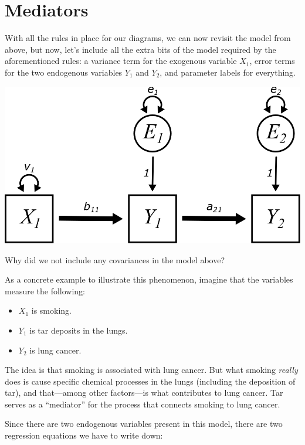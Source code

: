 \documentclass[
]{book}
\providecommand{\tightlist}{%
  \setlength{\itemsep}{0pt}\setlength{\parskip}{0pt}}
\begin{document}
\hypertarget{mediation-mediators}{%
\section{Mediators}\label{mediation-mediators}}

With all the rules in place for our diagrams, we can now revisit the model from above, but now, let's include all the extra bits of the model required by the aforementioned rules: a variance term for the exogenous variable \(X_{1}\), error terms for the two endogenous variables \(Y_{1}\) and \(Y_{2}\), and parameter labels for everything.

\begin{center}\includegraphics{graphics/mediator_vars} \end{center}

Why did we not include any covariances in the model above?

As a concrete example to illustrate this phenomenon, imagine that the variables measure the following:

\begin{itemize}
\tightlist
\item
  \(X_{1}\) is smoking.
\item
  \(Y_{1}\) is tar deposits in the lungs.
\item
  \(Y_{2}\) is lung cancer.
\end{itemize}

The idea is that smoking is associated with lung cancer. But what smoking \emph{really} does is cause specific chemical processes in the lungs (including the deposition of tar), and that---among other factors---is what contributes to lung cancer. Tar serves as a ``mediator'' for the process that connects smoking to lung cancer.

Since there are two endogenous variables present in this model, there are two regression equations we have to write down:
\end{document}
